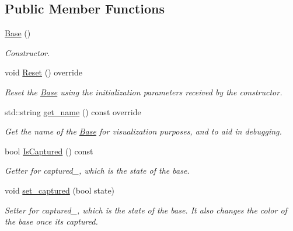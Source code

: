 \subsection*{Public Member Functions}
\begin{DoxyCompactItemize}
\item 
\hyperlink{classBase_a5ffe0568374d8b9b4c4ec32953fd6453}{Base} ()
\begin{DoxyCompactList}\small\item\em Constructor. \end{DoxyCompactList}\item 
void \hyperlink{classBase_aed35831f6e46b267305326389ec9d6da}{Reset} () override\hypertarget{classBase_aed35831f6e46b267305326389ec9d6da}{}\label{classBase_aed35831f6e46b267305326389ec9d6da}

\begin{DoxyCompactList}\small\item\em Reset the \hyperlink{classBase}{Base} using the initialization parameters received by the constructor. \end{DoxyCompactList}\item 
std\+::string \hyperlink{classBase_a02ef545d5165eed175f81c29f9881f07}{get\+\_\+name} () const override
\begin{DoxyCompactList}\small\item\em Get the name of the \hyperlink{classBase}{Base} for visualization purposes, and to aid in debugging. \end{DoxyCompactList}\item 
bool \hyperlink{classBase_a6a805a97e0a836cf354fd1e2e294d112}{Is\+Captured} () const 
\begin{DoxyCompactList}\small\item\em Getter for captured\+\_\+, which is the state of the base. \end{DoxyCompactList}\item 
void \hyperlink{classBase_a933e149b6a25c59ca631e2bb80a3c1df}{set\+\_\+captured} (bool state)\hypertarget{classBase_a933e149b6a25c59ca631e2bb80a3c1df}{}\label{classBase_a933e149b6a25c59ca631e2bb80a3c1df}

\begin{DoxyCompactList}\small\item\em Setter for captured\+\_\+, which is the state of the base. It also changes the color of the base once its captured. \end{DoxyCompactList}\end{DoxyCompactItemize}


